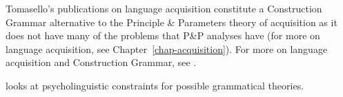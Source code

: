 Tomasello's publications on language acquisition
\citep{Tomasello2000a,Tomasello2003a,Tomasello2005a,Tomasello2006a}\nocite{Tomasello95a} constitute
a Construction Grammar alternative to the Principle \& Parameters theory of acquisition as it does
not have many of the problems that P\&P analyses have (for more on language acquisition, see
Chapter~\ref{chap-acquisition}).  For more on language acquisition and Construction Grammar,
see .

\citet{Dabrowska2004a} looks at psycholinguistic constraints for possible grammatical theories.  




